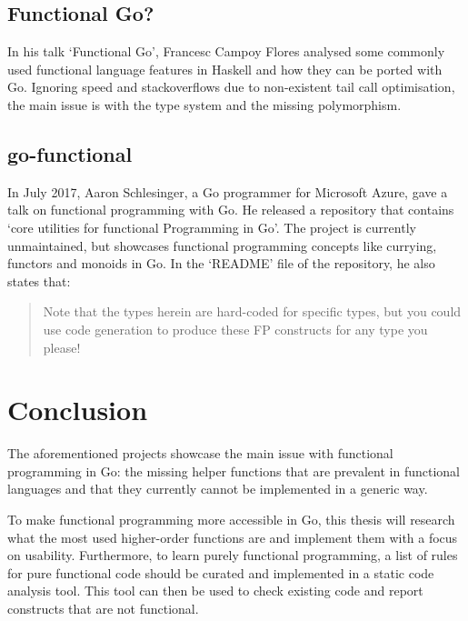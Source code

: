 \subsection{Functional Go?}

In his talk `Functional Go'\autocite{func-go-talk}, Francesc Campoy Flores analysed some commonly used functional
language features in Haskell and how they can be ported with Go. Ignoring speed and stackoverflows due to non-existent
tail call optimisation\autocite{go-tco}, the main issue is with the type system and the missing polymorphism.

\subsection{go-functional}

In July 2017, Aaron Schlesinger, a Go programmer for Microsoft Azure, gave a talk on functional programming with Go.
He released a repository\autocite{go-functional} that contains `core utilities for functional Programming in Go'.
The project is currently unmaintained, but showcases functional programming concepts like currying, functors and
monoids in Go. In the `README' file of the repository, he also states that:
\begin{quote}
    Note that the types herein are hard-coded for specific types, but you could
    use code generation to produce these FP constructs for any type you please!
    \autocite{go-functional-readme}
\end{quote}

\section{Conclusion}

The aforementioned projects showcase the main issue with functional programming in Go: the missing
helper functions that are prevalent in functional languages and that they currently cannot be implemented
in a generic way.

To make functional programming more accessible in Go, this thesis will research what the most used
higher-order functions are and implement them with a focus on usability.
Furthermore, to learn purely functional programming, a list of rules for pure functional code should
be curated and implemented in a static code analysis tool. This tool can then be used to check
existing code and report constructs that are not functional.
